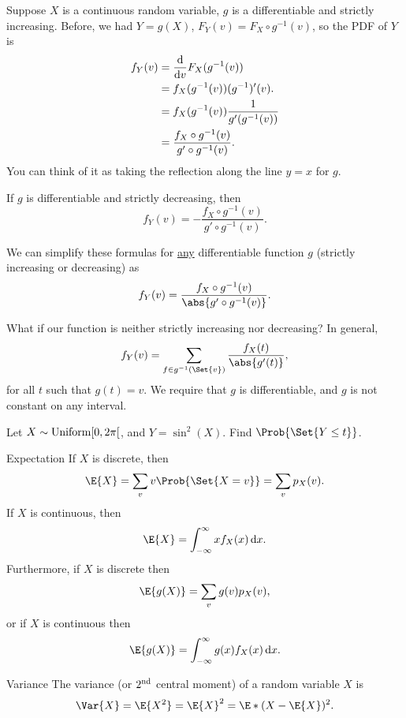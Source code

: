 \begin{Remark}{}{}
    Suppose $ X $ is a continuous random variable, $ g $ is a differentiable and
    strictly increasing. Before, we had $ Y=g(X) $,
    $ F_Y(v)=F_X\circ g^{-1}(v) $, so the PDF of $ Y $ is
    \begin{align*}
        f_Y(v)
         & =\odv*{F_X(g^{-1}(v))}{v}                      \\
         & =f_X(g^{-1}(v))(g^{-1})' (v).                  \\
         & =f_X(g^{-1}(v))\frac{1}{g'(g^{-1}(v))}         \\
         & =\frac{f_X\circ g^{-1}(v)}{g'\circ g^{-1}(v)}.
    \end{align*}
    You can think of it as taking
    the reflection along the line $ y=x $ for $ g $.

    If $ g $ is differentiable and strictly decreasing, then
    \[ f_Y(v)=-\frac{f_X\circ g^{-1}(v)}{g'\circ g^{-1}(v)}. \]

    We can simplify these formulas for \underline{any} differentiable
    function $ g $ (strictly increasing or decreasing) as
    \[ f_Y(v)=\frac{f_X\circ g^{-1}(v)}{\abs{g'\circ g^{-1}(v)}}. \]
\end{Remark}
\begin{Example}{}{}
    What if our function is neither strictly increasing nor decreasing?
    In general,
    \[ f_Y(v)=\sum_{f\in g^{-1}(\Set{v})}\frac{f_X(t)}{\abs{g'(t)}}, \]
    for all
    $ t $ such that $ g(t)=v $.
    We require that $ g $ is differentiable, and $ g $ is
    not constant on any interval.

    Let $ X \sim \text{Uniform}\interval[open right]{0}{2\pi}$, and $ Y=\sin^2(X) $.
    Find $ \Prob{\Set{Y\le t}} $.
\end{Example}
\begin{Definition}{Expectation}{}
    If $ X $ is discrete, then
    \[ \E{X}=\sum_v v\Prob{\Set{X=v}}=\sum_v p_X(v). \]
    If $ X $ is continuous, then
    \[ \E{X}=\int_{-\infty}^{\infty}x f_X(x)\odif{x}. \]
    Furthermore, if $ X $ is discrete then
    \[ \E{g(X)}=\sum_v g(v)p_X(v), \]
    or if $ X $ is continuous then
    \[ \E{g(X)}=\int_{-\infty}^{\infty}g(x)f_X(x)\odif{x}. \]
\end{Definition}
\begin{Definition}{Variance}{}
    The variance (or $ 2\textsuperscript{nd} $
    central moment) of a random variable $ X $ is
    \[ \Var{X}=\E{X^2}=\E{X}^2=\E*{(X-\E{X})^2}. \]
\end{Definition}
